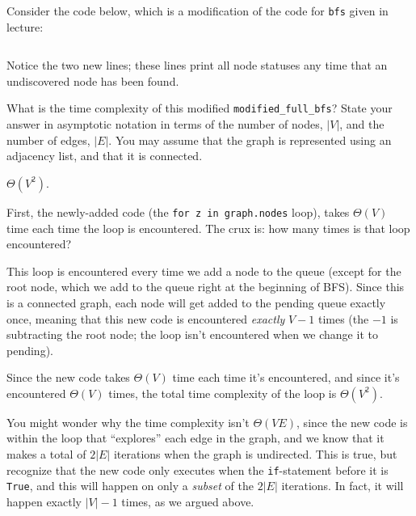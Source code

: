 \begin{prob}
    Consider the code below, which is a modification of the code for
    \texttt{bfs} given in lecture:

    \inputminted{python}{./code.py}

    Notice the two new lines; these lines print all node statuses any time that
    an undiscovered node has been found.

    What is the time complexity of this modified \texttt{modified_full_bfs}?
    State your answer in asymptotic notation in terms of the number of nodes,
    $|V|$, and the number of edges, $|E|$. You may assume that the graph is
    represented using an adjacency list, and that it is connected.

    \begin{soln}
        $\Theta(V^2)$.

        First, the newly-added code (the \texttt{for z in graph.nodes} loop),
        takes $\Theta(V)$ time each time the loop is encountered. The crux is: how many
        times is that loop encountered?

        This loop is encountered every time we add a node to the queue (except
        for the root node, which we add to the queue right at the beginning of
        BFS). Since this is a connected graph, each node will get added to the
        pending queue exactly once, meaning that this new code is encountered
        \emph{exactly} $V-1$ times (the $-1$ is subtracting the root node; the
        loop isn't encountered when we change it to pending).

        Since the new code takes $\Theta(V)$ time each time it's encountered,
        and since it's encountered $\Theta(V)$ times, the total time complexity of
        the loop is $\Theta(V^2)$.

        You might wonder why the time complexity isn't $\Theta(VE)$, since the
        new code is within the loop that ``explores'' each edge in the graph,
        and we know that it makes a total of $2|E|$ iterations when the graph
        is undirected. This is true, but recognize that the new code only
        executes when the \texttt{if}-statement before it is \texttt{True}, and
        this will happen on only a \emph{subset} of the $2|E|$ iterations. In
        fact, it will happen exactly $|V|-1$ times, as we argued above.
    \end{soln}

\end{prob}
